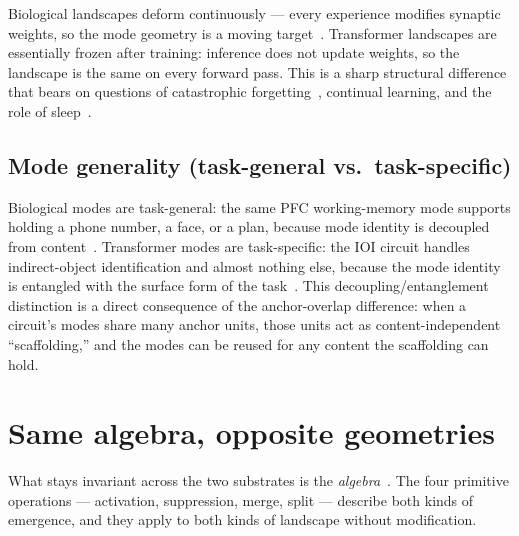 \documentclass[11pt,a4paper]{article}
\begin{document}
Biological landscapes deform continuously --- every experience
modifies synaptic weights, so the mode geometry is a moving
target~\cite{abbott2000plasticity}. Transformer landscapes are
essentially frozen after training: inference does not update
weights, so the landscape is the same on every forward pass. This is
a sharp structural difference that bears on questions of catastrophic
forgetting~\cite{french1999catastrophic,mcclelland1995complementary},
continual learning, and the role of sleep~\cite{tononi2014sleep}.

\subsection{Mode generality (task-general vs.\ task-specific)}

Biological modes are task-general: the same PFC working-memory mode
supports holding a phone number, a face, or a plan, because mode
identity is decoupled from
content~\cite{constantinidis2018workingmemory,parthasarathy2017mixed}.
Transformer modes are task-specific: the IOI circuit handles
indirect-object identification and almost nothing else, because the
mode identity is entangled with the surface form of the
task~\cite{wang2022interpretability}. This decoupling/entanglement
distinction is a direct consequence of the anchor-overlap difference:
when a circuit's modes share many anchor units, those units act as
content-independent ``scaffolding,'' and the modes can be reused for
any content the scaffolding can hold.

\section{Same algebra, opposite geometries}\label{sec:invariants}

What stays invariant across the two substrates is the
\emph{algebra}~\cite{companion}. The four primitive operations
--- activation, suppression, merge, split --- describe both kinds of
emergence, and they apply to both kinds of landscape without
modification.
\end{document}
